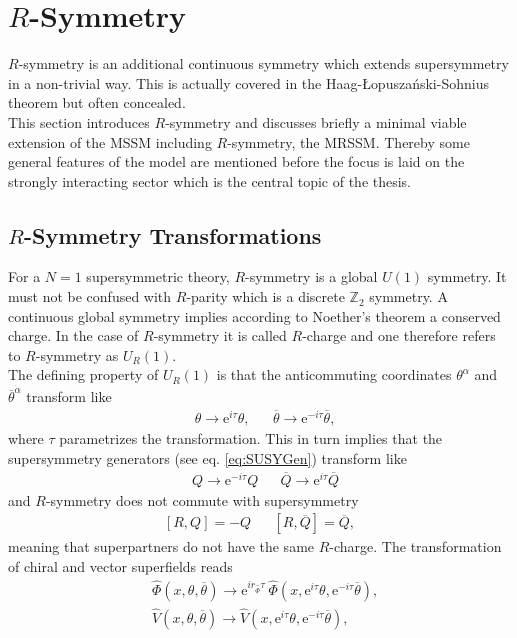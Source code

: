 \section{$R$-Symmetry}
$R$-symmetry is an additional continuous symmetry which extends  supersymmetry in a non-trivial way. This is actually covered in the Haag-{\L}opusza\'nski-Sohnius theorem \cite{Haag:1974qh} but often concealed.\\
This section introduces $R$-symmetry and discusses briefly a minimal viable extension of the MSSM including $R$-symmetry, the MRSSM. Thereby some general features of the model are mentioned before the focus is laid on the strongly interacting sector which is the central topic of the thesis. 


\subsection{$R$-Symmetry Transformations}
For a $N=1$ supersymmetric theory, $R$-symmetry is a global $U(1)$ symmetry. It must not be confused with $R$-parity which is a discrete $\mathbb{Z}_2$ symmetry. A continuous global symmetry implies according to Noether's theorem a conserved charge. In the case of $R$-symmetry it is called $R$-charge and one therefore refers to $R$-symmetry as $U_R(1)$.\\
The defining property of $U_R(1)$ is that the anticommuting coordinates $\theta^\alpha$ and $\overline{\theta}^{\dot{\alpha}}$ transform like
\begin{align}
&\theta \to \mathrm{e}^{i\tau}\theta, && \overline{\theta} \to \mathrm{e}^{-i\tau}\overline{\theta},
\end{align}
where $\tau$ parametrizes the transformation. This in turn implies that the supersymmetry generators (see eq. \eqref{eq:SUSYGen}) transform like
\begin{align}
& Q \to \mathrm{e}^{-i\tau} Q && \overline{Q} \to \mathrm{e}^{i\tau}\overline{Q}
\end{align}
and $R$-symmetry does not commute with supersymmetry 
\begin{align}
\left[ R,Q \right] = -Q && \left[ R,\overline{Q} \right] = \overline{Q},
\end{align}
meaning that superpartners do not have the same $R$-charge. The transformation of chiral and vector superfields reads
\begin{align}
& \hat{\Phi}(x,\theta,\overline{\theta}) \to \mathrm{e}^{ir_{\hat{\Phi}}\tau}\ \hat{\Phi}(x,\mathrm{e}^{i\tau}\theta,\mathrm{e}^{-i\tau}\overline{\theta}),\nonumber\\
&\hat{V}(x,\theta,\overline{\theta}) \to  \hat{V}(x,\mathrm{e}^{i\tau}\theta,\mathrm{e}^{-i\tau}\overline{\theta}),
\end{align}
